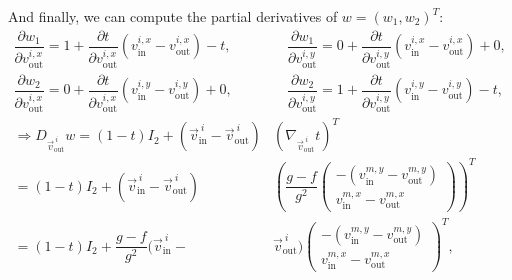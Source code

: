 \begin{proposition}
	And finally, we can compute the partial derivatives of $w = (w_1, w_2)^T$:
	\begin{align*}
		\dfrac{\partial w_1}{\partial v_{\text{out}}^{i, x}} = 1 + \dfrac{\partial t}{\partial v_{\text{out}}^{i, x}}(v_{\text{in}}^{i, x}- v_{\text{out}}^{i, x}) - t, &\quad 
		\dfrac{\partial w_1}{\partial v_{\text{out}}^{i, y}} = 0 + \dfrac{\partial t}{\partial v_{\text{out}}^{i, y}}(v_{\text{in}}^{i, x}- v_{\text{out}}^{i, x}) + 0, \\[0.5em]
		\dfrac{\partial w_2}{\partial v_{\text{out}}^{i, x}} = 0 + \dfrac{\partial t}{\partial v_{\text{out}}^{i, x}}(v_{\text{in}}^{i, y}- v_{\text{out}}^{i, y}) + 0, &\quad 
		\dfrac{\partial w_2}{\partial v_{\text{out}}^{i, y}} = 1 + \dfrac{\partial t}{\partial v_{\text{out}}^{i, y}}(v_{\text{in}}^{i, y}- v_{\text{out}}^{i, y}) - t, \\[0.5em]
		\Rightarrow D_{\vec{v}_{\text{out}}^{\: i}} w = (1-t)I_2 + (\vec{v}_{\text{in}}^{\: i} - \vec{v}_{\text{out}}^{\: i}) &(\nabla_{\vec{v}_{\text{out}}^{\: i}} t)^T \\[0.5em]
		= (1-t)I_2 + (\vec{v}_{\text{in}}^{\: i} - \vec{v}_{\text{out}}^{\: i}) &\left(\dfrac{g - f}{g^2} \begin{pmatrix}
			-(v_{\text{in}}^{m, y} - v_{\text{out}}^{m, y}) \\[0.5em]
			 v_{\text{in}}^{m, x} - v_{\text{out}}^{m, x}
		\end{pmatrix}\right)^T \\[0.5em]
		= (1-t)I_2 + \dfrac{g - f}{g^2}(\vec{v}_{\text{in}}^{\: i} - &\vec{v}_{\text{out}}^{\: i}) \begin{pmatrix}
			-(v_{\text{in}}^{m, y} - v_{\text{out}}^{m, y}) \\[0.5em]
			 v_{\text{in}}^{m, x} - v_{\text{out}}^{m, x}
		\end{pmatrix}^T, \\[0.5em]
	\end{align*}
	

\end{proposition}
